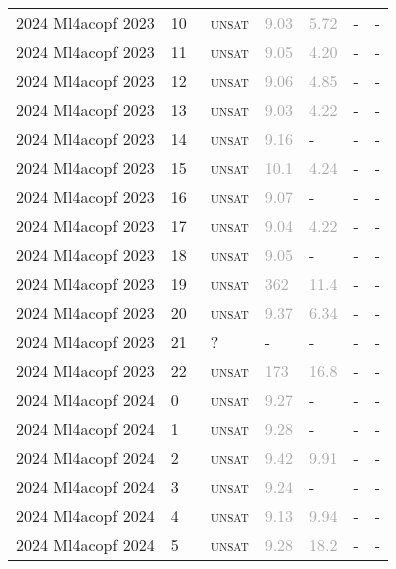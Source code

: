 \begin{center}
{\begin{longtable}{@{}lllllll@{}}
2024 Ml4acopf 2023 & 10 & ~\textsc{unsat} & \textcolor{darkgray}{9.03} & \textcolor{darkgray}{5.72} & - & - \\
2024 Ml4acopf 2023 & 11 & ~\textsc{unsat} & \textcolor{darkgray}{9.05} & \textcolor{darkgray}{4.20} & - & - \\
2024 Ml4acopf 2023 & 12 & ~\textsc{unsat} & \textcolor{darkgray}{9.06} & \textcolor{darkgray}{4.85} & - & - \\
2024 Ml4acopf 2023 & 13 & ~\textsc{unsat} & \textcolor{darkgray}{9.03} & \textcolor{darkgray}{4.22} & - & - \\
2024 Ml4acopf 2023 & 14 & ~\textsc{unsat} & \textcolor{darkgray}{9.16} & - & - & - \\
2024 Ml4acopf 2023 & 15 & ~\textsc{unsat} & \textcolor{darkgray}{10.1} & \textcolor{darkgray}{4.24} & - & - \\
2024 Ml4acopf 2023 & 16 & ~\textsc{unsat} & \textcolor{darkgray}{9.07} & - & - & - \\
2024 Ml4acopf 2023 & 17 & ~\textsc{unsat} & \textcolor{darkgray}{9.04} & \textcolor{darkgray}{4.22} & - & - \\
2024 Ml4acopf 2023 & 18 & ~\textsc{unsat} & \textcolor{darkgray}{9.05} & - & - & - \\
2024 Ml4acopf 2023 & 19 & ~\textsc{unsat} & \textcolor{darkgray}{362} & \textcolor{darkgray}{11.4} & - & - \\
2024 Ml4acopf 2023 & 20 & ~\textsc{unsat} & \textcolor{darkgray}{9.37} & \textcolor{darkgray}{6.34} & - & - \\
2024 Ml4acopf 2023 & 21 & ~? & - & - & - & - \\
2024 Ml4acopf 2023 & 22 & ~\textsc{unsat} & \textcolor{darkgray}{173} & \textcolor{darkgray}{16.8} & - & - \\
\midrule
2024 Ml4acopf 2024 & 0 & ~\textsc{unsat} & \textcolor{darkgray}{9.27} & - & - & - \\
2024 Ml4acopf 2024 & 1 & ~\textsc{unsat} & \textcolor{darkgray}{9.28} & - & - & - \\
2024 Ml4acopf 2024 & 2 & ~\textsc{unsat} & \textcolor{darkgray}{9.42} & \textcolor{darkgray}{9.91} & - & - \\
2024 Ml4acopf 2024 & 3 & ~\textsc{unsat} & \textcolor{darkgray}{9.24} & - & - & - \\
2024 Ml4acopf 2024 & 4 & ~\textsc{unsat} & \textcolor{darkgray}{9.13} & \textcolor{darkgray}{9.94} & - & - \\
2024 Ml4acopf 2024 & 5 & ~\textsc{unsat} & \textcolor{darkgray}{9.28} & \textcolor{darkgray}{18.2} & - & - \\

\end{longtable}}
\end{center}
